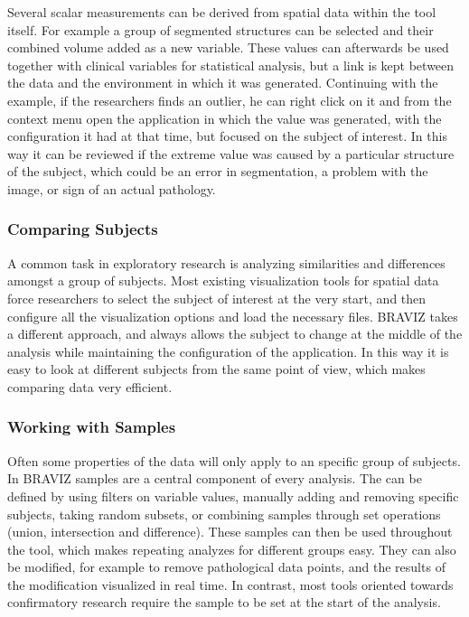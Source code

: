 \documentclass[twocolumn]{svjour3}
\begin{document}
Several scalar measurements can be derived from spatial data within the tool itself. For example a group of segmented structures can be selected and their combined volume added as a new variable. These values can afterwards be used together with clinical variables for statistical analysis, but a link is kept between the data and the environment in which it was generated. Continuing with the example, if the researchers finds an outlier, he can right click on it and from the context menu open the application in which the value was generated, with the configuration it had at that time, but focused on the subject of interest. In this way it can be reviewed if the extreme value was caused by a particular structure of the subject, which could be an error in segmentation, a problem with the image, or sign of an actual pathology.

\subsubsection{Comparing Subjects}

A common task in exploratory research is analyzing similarities and differences amongst a group of subjects. Most existing visualization tools for spatial data force researchers to select the subject of interest at the very start, and then configure all the visualization options and load the necessary files. BRAVIZ takes a different approach, and always allows the subject to change at the middle of the analysis while maintaining the configuration of the application. In this way it is easy to look at different subjects from the same point of view, which makes comparing data very efficient.  

\subsubsection{Working with Samples}

Often some properties of the data will only apply to an specific group of subjects. In BRAVIZ samples are a central component of every analysis. The can be defined by using filters on variable values, manually adding and removing specific subjects, taking random subsets, or combining samples through set operations (union, intersection and difference). These samples can then be used throughout the tool, which makes repeating analyzes for different groups easy. They can also be modified, for example to remove pathological data points, and the results of the modification visualized in real time. In contrast, most tools oriented towards confirmatory research require the sample to be set at the start of the analysis.
\end{document}
